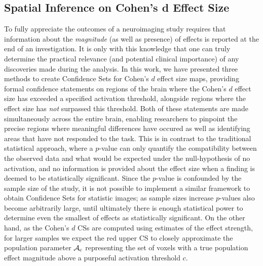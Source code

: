 \subsection{Spatial Inference on Cohen's d Effect Size}
To fully appreciate the outcomes of a neuroimaging study requires that information about the \textit{magnitude} (as well as presence) of effects is reported at the end of an investigation. It is only with this knowledge that one can truly determine the practical relevance (and potential clinical importance) of any discoveries made during the analysis. In this work, we have presented three methods to create Confidence Sets for Cohen's $d$ effect size maps, providing formal confidence statements on regions of the brain where the Cohen's $d$ effect size has exceeded a specified activation threshold, alongside regions where the effect size has \textit{not} surpassed this threshold. Both of these statements are made simultaneously across the entire brain, enabling researchers to pinpoint the precise regions where meaningful differences have occured as well as identifying areas that have not responded to the task. This is in contrast to the traditional statistical approach, where a $p$-value can only quantify the compatibility between the observed data and what would be expected under the null-hypothesis of no activation, and no information is provided about the effect size when a finding is deemed to be statistically significant. Since the $p$-value is confounded by the sample size of the study, it is not possible to implement a similar framework to obtain Confidence Sets for statistic images; as sample sizes increase $p$-values also become arbitrarily large, until ultimately there is enough statistical power to determine even the smallest of effects as statistically significant. On the other hand, as the Cohen's $d$ CSs are computed using estimates of the effect strength, for larger samples we expect the red upper CS to closely approximate the population parameter $\operatorname{\mathcal{A}_{c}}$ representing the set of voxels with a true population effect magnitude above a purposeful activation threshold $c$.

